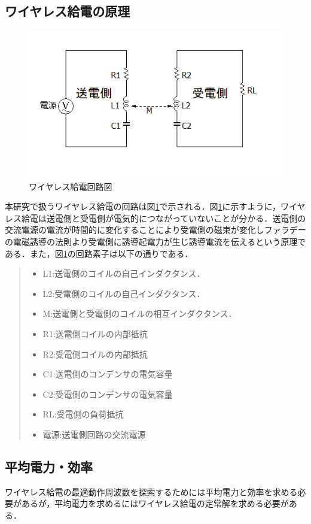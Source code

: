 \documentclass[12pt]{jarticle}
\begin{document}
\subsection{ワイヤレス給電の原理}
\begin{figure}[h]
	\centering
	\includegraphics[]{wpt_2020128.png}
	\caption{ワイヤレス給電回路図}
	\label{fig:wpt_kairo}
\end{figure}
本研究で扱うワイヤレス給電の回路は図\ref{fig:wpt_kairo}で示される．図\ref{fig:wpt_kairo}に示すように，ワイヤレス給電は送電側と受電側が電気的につながっていないことが分かる．送電側の交流電源の電流が時間的に変化することにより受電側の磁束が変化しファラデーの電磁誘導の法則より受電側に誘導起電力が生じ誘導電流を伝えるという原理である．また，図\ref{fig:wpt_kairo}の回路素子は以下の通りである．
\begin{quote}
	\begin{itemize}
		\item L1:送電側のコイルの自己インダクタンス．
		\item L2:受電側のコイルの自己インダクタンス．
		\item M:送電側と受電側のコイルの相互インダクタンス．
		\item R1:送電側コイルの内部抵抗
		\item R2:受電側コイルの内部抵抗
		\item C1:送電側のコンデンサの電気容量
		\item C2:受電側のコンデンサの電気容量
		\item RL:受電側の負荷抵抗
		\item 電源:送電側回路の交流電源
	\end{itemize}
\end{quote}
\clearpage
\subsection{平均電力・効率}
ワイヤレス給電の最適動作周波数を探索するためには平均電力と効率を求める必要があるが，平均電力を求めるにはワイヤレス給電の定常解を求める必要がある．
\end{document}
